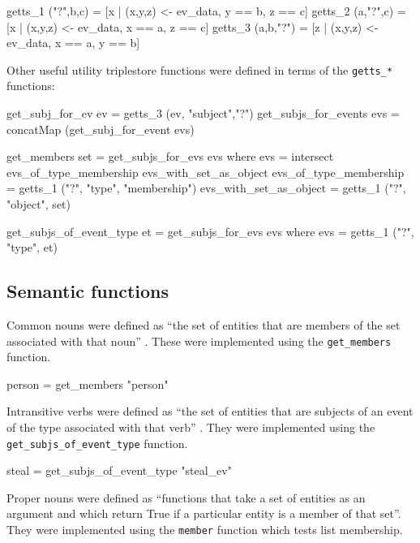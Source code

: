 \documentclass[../main.tex]{subfiles}
\begin{document}
\begin{code}
	getts_1 ("?",b,c)   = [x | (x,y,z) <- ev_data, y == b, z == c]
	getts_2 (a,"?",c)   = [x | (x,y,z) <- ev_data, x == a, z == c]
	getts_3 (a,b,"?")   = [z | (x,y,z) <- ev_data, x == a, y == b]
\end{code}

Other useful utility triplestore functions were defined in terms of the \texttt{getts\_*}
functions:

\begin{code}
	get_subj_for_ev ev       = getts_3 (ev,  "subject","?")
	get_subjs_for_events evs = concatMap (get_subj_for_event evs)
	
	get_members set = get_subjs_for_evs evs
	where
		evs = intersect evs_of_type_membership evs_with_set_as_object
		evs_of_type_membership   = getts_1 ("?", "type", "membership")
		evs_with_set_as_object   = getts_1 ("?",  "object",  set)
		
	get_subjs_of_event_type et  = get_subjs_for_evs evs
	where
		evs = getts_1 ("?",  "type",  et)
\end{code}

\subsection{Semantic functions}

Common nouns were defined as ``the set of entities that are members of the set associated with that noun'' \cite{frost2014denotational}.
These were implemented using the \texttt{get\_members} function.

\begin{code}
	person = get_members "person"
\end{code}

Intransitive verbs were defined as ``the set of entities that are subjects of an event of the type associated with that verb'' \cite{frost2014denotational}.
They were implemented using the \texttt{get\_subjs\_of\_event\_type} function.

\begin{code}
	steal = get_subjs_of_event_type "steal_ev"
\end{code}

Proper nouns were defined as ``functions that take a set of entities as an
argument and which return True if a particular entity is a member of that
set''\cite{frost2014denotational}.  They were implemented using the
\texttt{member} function which tests list membership.
\end{document}
